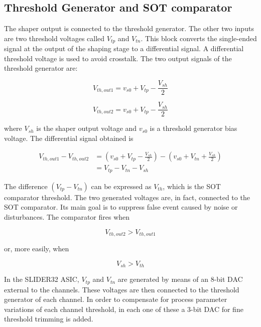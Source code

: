 
\subsection*{Threshold Generator and SOT comparator} \label{thrSOT}
The shaper output is connected to the threshold generator. The other two inputs are two threshold voltages called $V_{tp}$ and $V_{tn}$. This block converts the single-ended signal at the output of the shaping stage to a differential signal. A differential threshold voltage is used to avoid crosstalk. The two output signals of the threshold generator are:

\begin{equation}
    V_{th, out1} = v_{s0} + V_{tp} - \frac{V_{sh}}{2}
\end{equation}

\begin{equation}
    V_{th, out2} = v_{s0} + V_{tp} - \frac{V_{sh}}{2}
\end{equation}

\noindent
where $V_{sh}$ is the shaper output voltage and $v_{s0}$ is a threshold generator bias voltage. The differential signal obtained is

\begin{equation}
    \begin{split}
        V_{th, out1} - V_{th, out2} & = (v_{s0} + V_{tp} - \frac{V_{sh}}{2}) - (v_{s0} + V_{tn} + \frac{V_{sh}}{2}) \\
        & = V_{tp} - V_{tn} - V_{sh}
    \end{split}
\end{equation}

The difference $(V_{tp} - V_{tn})$ can be expressed as $V_{th}$, which is the SOT comparator threshold. The two generated voltages are, in fact, connected to the SOT comparator. Its main goal is to suppress false event caused by noise or disturbances. The comparator fires when

\begin{equation}
    V_{th, out2} > V_{th, out1}
\end{equation}

\noindent
or, more easily, when

\begin{equation}
    V_{sh} > V_{th}
\end{equation}

\noindent
In the SLIDER32 ASIC, $V_{tp}$ and $V_{tn}$ are generated by means of an 8-bit DAC external to the channels. These voltages are then connected to the threshold generator of each channel. In order to compensate for process parameter variations of each channel threshold, in each one of these a 3-bit DAC for fine threshold trimming is added.

